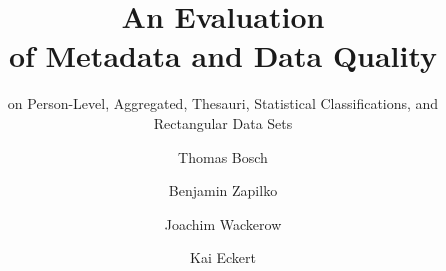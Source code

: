 \documentclass{llncs}
\begin{document}
\renewcommand{\arraystretch}{1.3}
%
%
\title{An Evaluation \\
of Metadata and Data Quality}
\subtitle{on Person-Level, Aggregated, Thesauri, Statistical Classifications, and Rectangular Data Sets}


%
\author{Thomas Bosch \and Benjamin Zapilko \and Joachim Wackerow \and Kai Eckert}
%
\authorrunning{} %
%

\maketitle              %
\end{document}
